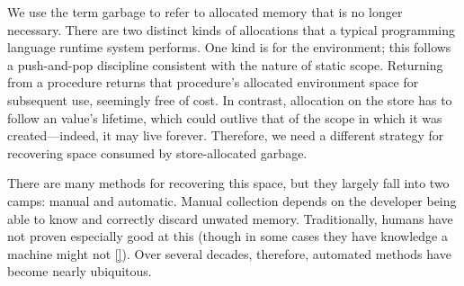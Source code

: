 
We use the term garbage to refer to allocated memory that is no longer
necessary. There are two distinct kinds of allocations that a typical
programming language runtime system performs. One kind is for the environment;
this follows a push-and-pop discipline consistent with the nature of static
scope. Returning from a procedure returns that procedure’s allocated environment
space for subsequent use, seemingly free of cost. In contrast, allocation on the
store has to follow an value’s lifetime, which could outlive that of the scope
in which it was created—indeed, it may live forever. Therefore, we need a
different strategy for recovering space consumed by store-allocated garbage.

There are many methods for recovering this space, but they largely fall into two
camps: manual and automatic. Manual collection depends on the developer being
able to know and correctly discard unwated memory. Traditionally, humans have
not proven especially good at this (though in some cases they have knowledge a
machine might not \ref{}). Over several decades, therefore, automated methods
have become nearly ubiquitous.
